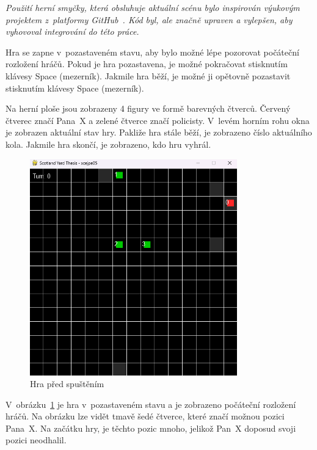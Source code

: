 \textit{Použití herní smyčky, která obsluhuje aktuální scénu bylo inspirován výukovým projektem z~platformy GitHub~\cite{GameSceneController}.
Kód byl, ale značně upraven a vylepšen, aby vyhovoval integrování do této práce.}

Hra se zapne v~pozastaveném stavu, aby bylo možné lépe pozorovat počáteční rozložení hráčů.
Pokud je hra pozastavena, je možné pokračovat stisknutím klávesy Space (mezerník).
Jakmile hra běží, je možné ji opětovně pozastavit stisknutím klávesy Space (mezerník).


Na herní ploše jsou zobrazeny 4 figury ve formě barevných čtverců.
Červený čtverec značí Pana~X a zelené čtverce značí policisty.
V~levém horním rohu okna je zobrazen aktuální stav hry.
Pakliže hra stále běží, je zobrazeno číslo aktuálního kola.
Jakmile hra skončí, je zobrazeno, kdo hru vyhrál.
\begin{figure}[H]
	\centering
	\includegraphics[width=0.8\textwidth]{obrazky-figures/game_0}
    \caption{Hra před spuštěním}
    \label{fig:game_0}
\end{figure}

V~obrázku~\ref{fig:game_0} je hra v~pozastaveném stavu a je zobrazeno počáteční rozložení hráčů.
Na obrázku lze vidět tmavě šedé čtverce, které značí možnou pozici Pana~X\@.
Na začátku hry, je těchto pozic mnoho, jelikož Pan~X doposud svoji pozici neodhalil.


